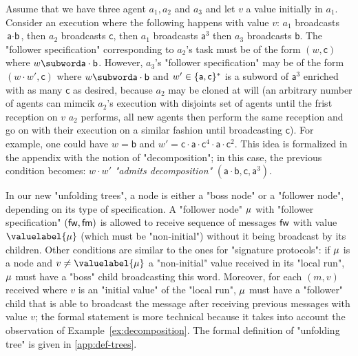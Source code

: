 \begin{example}

\label{ex:decomposition}
Assume that we have three agent $a_1,a_2$ and $a_3$ and let $v$ a value initially in $a_1$. Consider an execution where the following happens with value $v$: $a_1$ broadcasts $\textsf{a} \cdot \textsf{b}$, then $a_2$ broadcasts $\textsf{c}$, then $a_1$ broadcasts $\textsf{a}^3$ then $a_3$ broadcasts $\textsf{b}$. The "follower specification" corresponding to $a_2$'s task must be of the form $(w, \textsf{c})$ where $w \subword \textsf{a} \cdot \textsf{b}$. However, $a_3$'s "follower specification" may be of the form $(w \cdot w', \textsf{c})$ where $w \subword \textsf{a} \cdot \textsf{b}$ and $w' \in \{\textsf{a},\textsf{c}\}^*$ is a subword of $\textsf{a}^3$ enriched with as many $\textsf{c}$ as desired, because $a_2$ may be cloned at will (an arbitrary number of agents can mimcik $a_2$'s execution with disjoints set of agents until the frist reception on $v$ $a_2$ performs, all new agents then perform the same reception and go on with their execution on a similar fashion until broadcasting $\textsf{c}$). For example, one could have $w= \textsf{b} $ and $w' = \textsf{c} \cdot \textsf{a} \cdot \textsf{c}^4 \cdot \textsf{a} \cdot \textsf{c}^2$. This idea is formalized in the appendix with the notion of "decomposition"; in this case, the previous condition becomes: $w \cdot w'$ \emph{"admits decomposition"} $(\textsf{a} \cdot \textsf{b}, \textsf{c}, \textsf{a}^3)$.   

\end{example}

In our new "unfolding trees", a node is either a "boss node" or a "follower node", depending on its type of specification. 
A "follower node" $\mu$ with "follower specification" $(\mathsf{fw}, \mathsf{fm})$ is allowed to receive sequence of messages $\mathsf{fw}$ with value $\valuelabel{\node}$ (which must be "non-initial") without it being broadcast by its children. 
Other conditions are similar to the ones for "signature protocols": if $\mu$ is a node and $v \ne \valuelabel{\node}$ a "non-initial" value received in its "local run", $\mu$ must have a "boss" child broadcasting this word. Moreover, for each $(m,v)$ received where $v$ is an "initial value" of the "local run", $\mu$ must have a "follower" child that is able to broadcast the message after receiving previous messages with value $v$; the formal statement is more technical because it takes into account the observation of Example~\ref{ex:decomposition}. 
The formal definition of "unfolding tree" is given in \cref{app:def-trees}.



